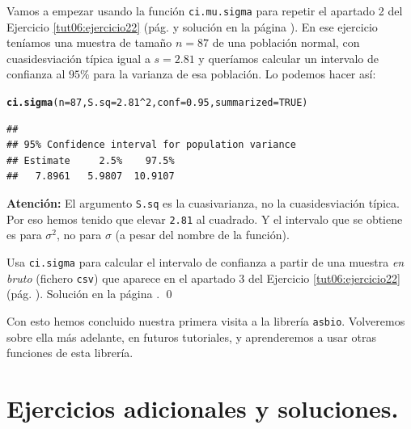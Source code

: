\documentclass[10pt,a4paper]{article}\usepackage[]{graphicx}\usepackage[]{color}
\makeatletter
\newcommand{\hlnum}[1]{\textcolor[rgb]{0.686,0.059,0.569}{#1}}%
\newcommand{\hlopt}[1]{\textcolor[rgb]{0,0,0}{#1}}%
\newcommand{\hlstd}[1]{\textcolor[rgb]{0.345,0.345,0.345}{#1}}%
\newcommand{\hlkwc}[1]{\textcolor[rgb]{0.333,0.667,0.333}{#1}}%
\newcommand{\hlkwd}[1]{\textcolor[rgb]{0.737,0.353,0.396}{\textbf{#1}}}%
\newenvironment{kframe}{%
 \def\at@end@of@kframe{}%
 \ifinner\ifhmode%
  \def\at@end@of@kframe{\end{minipage}}%
  \begin{minipage}{\columnwidth}%
 \fi\fi%
 \def\FrameCommand##1{\hskip\@totalleftmargin \hskip-\fboxsep
 \colorbox{shadecolor}{##1}\hskip-\fboxsep
     \hskip-\linewidth \hskip-\@totalleftmargin \hskip\columnwidth}%
 \MakeFramed {\advance\hsize-\width
   \@totalleftmargin\z@ \linewidth\hsize
   \@setminipage}}%
 {\par\unskip\endMakeFramed%
 \at@end@of@kframe}
\newenvironment{knitrout}{}{} %
\makeatother
\begin{document}
Vamos a empezar usando la función {\tt ci.mu.sigma} para repetir el apartado 2 del Ejercicio \ref{tut06:ejercicio22} (pág. \pageref{tut06:ejercicio22} y solución en la página \pageref{tut06:ejercicio22:sol}). En ese ejercicio teníamos una muestra de tamaño $n=87$ de una población normal, con cuasidesviación típica igual a $s=2.81$ y queríamos calcular un intervalo de confianza al $95\%$ para la varianza de esa población. Lo podemos hacer así:
\begin{knitrout}
\color{fgcolor}\begin{kframe}
\begin{alltt}
\hlkwd{ci.sigma}\hlstd{(}\hlkwc{n}\hlstd{=}\hlnum{87}\hlstd{,} \hlkwc{S.sq} \hlstd{=} \hlnum{2.81}\hlopt{^}\hlnum{2}\hlstd{,} \hlkwc{conf}\hlstd{=}\hlnum{0.95}\hlstd{,} \hlkwc{summarized}\hlstd{=}\hlnum{TRUE}\hlstd{)}
\end{alltt}
\begin{verbatim}
## 
## 95% Confidence interval for population variance 
## Estimate     2.5%    97.5% 
##   7.8961   5.9807  10.9107
\end{verbatim}
\end{kframe}
\end{knitrout}
{\bf Atención:} El argumento {\tt S.sq} es la cuasivarianza, no la cuasidesviación típica. Por eso hemos tenido que elevar {\tt 2.81} al cuadrado. Y el intervalo que se obtiene es para $\sigma^2$, no para $\sigma$ (a pesar del nombre de la función).

\begin{ejercicio}
\label{tut06:ejercicio25}
Usa {\tt ci.sigma} para calcular el intervalo de confianza a partir de una muestra {\em en bruto} (fichero {\tt csv}) que aparece en el apartado 3 del Ejercicio \ref{tut06:ejercicio22} (pág. \pageref{tut06:ejercicio22}). Solución en la página \pageref{tut06:ejercicio25:sol}.
\qed
\end{ejercicio}

Con esto hemos concluido nuestra primera visita a la librería {\tt asbio}. Volveremos sobre ella más adelante, en futuros tutoriales, y aprenderemos a usar otras funciones de esta librería.


%
%
%

\section{Ejercicios adicionales y soluciones.}
\label{tut06:sec:EjerciciosAdicionalesYSoluciones}
\end{document}
